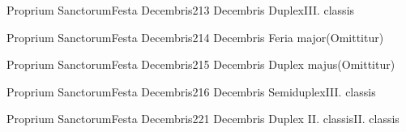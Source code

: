 \documentclass[nocturnale-romanum.tex]{subfiles}
\begin{document}
	{Proprium Sanctorum}{Festa Decembris}{2}{13 Decembris}
	{Duplex}{III. classis}
	{}
	{}

	{Proprium Sanctorum}{Festa Decembris}{2}{14 Decembris}
	{Feria major}{(Omittitur)}
	{}
	{}

	{Proprium Sanctorum}{Festa Decembris}{2}{15 Decembris}
	{Duplex majus}{(Omittitur)}
	{}
	{}

	{Proprium Sanctorum}{Festa Decembris}{2}{16 Decembris}
	{Semiduplex}{III. classis}
	{}
	{}

	{Proprium Sanctorum}{Festa Decembris}{2}{21 Decembris}
	{Duplex II. classis}{II. classis}
	{}
	{}
	
\end{document}
